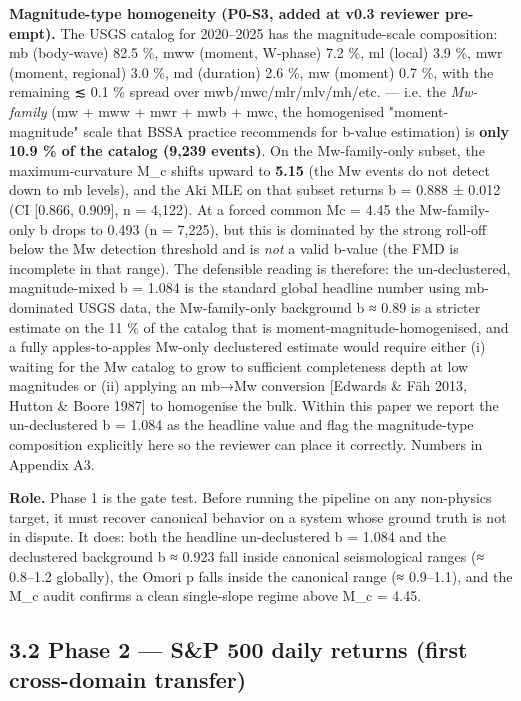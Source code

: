 \documentclass[
  11pt]{article}
\begin{document}
\textbf{Magnitude-type homogeneity (P0-S3, added at v0.3 reviewer
pre-empt).} The USGS catalog for 2020--2025 has the magnitude-scale
composition: mb (body-wave) 82.5 \%, mww (moment, W-phase) 7.2 \%, ml
(local) 3.9 \%, mwr (moment, regional) 3.0 \%, md (duration) 2.6 \%, mw
(moment) 0.7 \%, with the remaining ≲ 0.1 \% spread over
mwb/mwc/mlr/mlv/mh/etc. --- i.e. the \emph{Mw-family} (mw + mww + mwr +
mwb + mwc, the homogenised "moment-magnitude" scale that BSSA practice
recommends for b-value estimation) is \textbf{only 10.9 \% of the
catalog (9,239 events)}. On the Mw-family-only subset, the
maximum-curvature M\_c shifts upward to \textbf{5.15} (the Mw events do
not detect down to mb levels), and the Aki MLE on that subset returns b
= 0.888 ± 0.012 (CI {[}0.866, 0.909{]}, n = 4,122). At a forced common
Mc = 4.45 the Mw-family-only b drops to 0.493 (n = 7,225), but this is
dominated by the strong roll-off below the Mw detection threshold and is
\emph{not} a valid b-value (the FMD is incomplete in that range). The
defensible reading is therefore: the un-declustered, magnitude-mixed b =
1.084 is the standard global headline number using mb-dominated USGS
data, the Mw-family-only background b ≈ 0.89 is a stricter estimate on
the 11 \% of the catalog that is moment-magnitude-homogenised, and a
fully apples-to-apples Mw-only declustered estimate would require either
(i) waiting for the Mw catalog to grow to sufficient completeness depth
at low magnitudes or (ii) applying an mb→Mw conversion {[}Edwards \& Fäh
2013, Hutton \& Boore 1987{]} to homogenise the bulk. Within this paper
we report the un-declustered b = 1.084 as the headline value and flag
the magnitude-type composition explicitly here so the reviewer can place
it correctly. Numbers in Appendix A3.

\textbf{Role.} Phase 1 is the gate test. Before running the pipeline on
any non-physics target, it must recover canonical behavior on a system
whose ground truth is not in dispute. It does: both the headline
un-declustered b = 1.084 and the declustered background b ≈ 0.923 fall
inside canonical seismological ranges (≈ 0.8--1.2 globally), the Omori p
falls inside the canonical range (≈ 0.9--1.1), and the M\_c audit
confirms a clean single-slope regime above M\_c = 4.45.

\subsection{3.2 Phase 2 --- S\&P 500 daily returns (first cross-domain
transfer)}\label{32-phase-2--sp-500-daily-returns-first-cross-domain-transfer}
\end{document}
